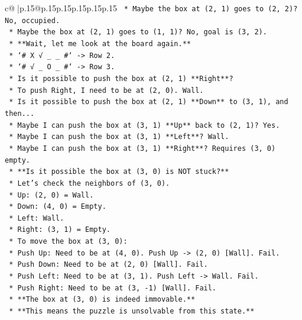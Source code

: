 \documentclass{article}
\begin{document}
{\begin{supertabular}{c@{$\;$}|p{.15\linewidth}@{}p{.15\linewidth}p{.15\linewidth}p{.15\linewidth}p{.15\linewidth}p{.15\linewidth}}
{{{\texttt{        *   Maybe the box at (2, 1) goes to (2, 2)? No, occupied.} \\
\texttt{        *   Maybe the box at (2, 1) goes to (1, 1)? No, goal is (3, 2).} \\
\texttt{        *   **Wait, let me look at the board again.**} \\
\texttt{        *   `\# X √ \_ \_ \#` {-}> Row 2.} \\
\texttt{        *   `\# √ \_ O \_ \#` {-}> Row 3.} \\
\texttt{        *   Is it possible to push the box at (2, 1) **Right**?} \\
\texttt{        *   To push Right, I need to be at (2, 0). Wall.} \\
\texttt{        *   Is it possible to push the box at (2, 1) **Down** to (3, 1), and then...} \\
\texttt{        *   Maybe I can push the box at (3, 1) **Up** back to (2, 1)? Yes.} \\
\texttt{        *   Maybe I can push the box at (3, 1) **Left**? Wall.} \\
\texttt{        *   Maybe I can push the box at (3, 1) **Right**? Requires (3, 0) empty.} \\
\texttt{        *   **Is it possible the box at (3, 0) is NOT stuck?**} \\
\texttt{        *   Let's check the neighbors of (3, 0).} \\
\texttt{        *   Up: (2, 0) = Wall.} \\
\texttt{        *   Down: (4, 0) = Empty.} \\
\texttt{        *   Left: Wall.} \\
\texttt{        *   Right: (3, 1) = Empty.} \\
\texttt{        *   To move the box at (3, 0):} \\
\texttt{            *   Push Up: Need to be at (4, 0). Push Up {-}> (2, 0) {[}Wall{]}. Fail.} \\
\texttt{            *   Push Down: Need to be at (2, 0) {[}Wall{]}. Fail.} \\
\texttt{            *   Push Left: Need to be at (3, 1). Push Left {-}> Wall. Fail.} \\
\texttt{            *   Push Right: Need to be at (3, {-}1) {[}Wall{]}. Fail.} \\
\texttt{        *   **The box at (3, 0) is indeed immovable.**} \\
\texttt{        *   **This means the puzzle is unsolvable from this state.**} \\
}}}
\end{supertabular}}
\end{document}
